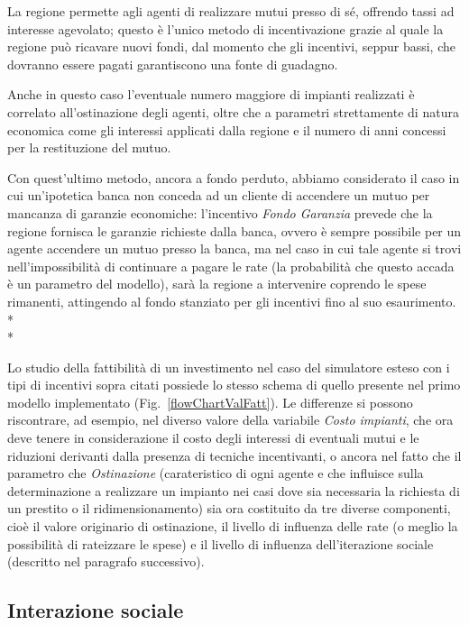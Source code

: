 
La regione permette agli agenti di realizzare mutui presso di sé, offrendo tassi ad interesse agevolato; questo è l'unico metodo di incentivazione grazie al quale la regione può ricavare nuovi fondi, dal momento che gli incentivi, seppur bassi, che dovranno essere pagati garantiscono una fonte di guadagno.

Anche in questo caso l'eventuale numero maggiore di impianti realizzati è correlato all'ostinazione degli agenti, oltre che a parametri strettamente di natura economica come gli interessi applicati dalla regione e il numero di anni concessi per la restituzione del mutuo.


Con quest'ultimo metodo, ancora a fondo perduto, abbiamo considerato il caso in cui un'ipotetica banca non conceda ad un cliente di accendere un mutuo per mancanza di garanzie economiche: l'incentivo \emph{Fondo Garanzia} prevede che la regione fornisca le garanzie richieste dalla banca, ovvero è sempre possibile per un agente accendere un mutuo presso la banca, ma nel caso in cui tale agente si trovi nell'impossibilità di continuare a pagare le rate (la probabilità che questo accada è un parametro del modello), sarà la regione a intervenire coprendo le spese rimanenti, attingendo al fondo stanziato per gli incentivi fino al suo esaurimento.\\*\\*

Lo studio della fattibilità di un investimento nel caso del simulatore esteso con i tipi di incentivi sopra citati possiede lo stesso schema di quello presente nel primo modello implementato (Fig.~\ref{flowChartValFatt}). Le differenze si possono riscontrare, ad esempio, nel diverso valore della variabile \emph{Costo impianti}, che ora deve tenere in considerazione il costo degli interessi di eventuali mutui e le riduzioni derivanti dalla presenza di tecniche incentivanti, o ancora nel fatto che il parametro che \emph{Ostinazione} (carateristico di ogni agente e che influisce sulla determinazione a realizzare un impianto nei casi dove sia necessaria la richiesta di un prestito o il ridimensionamento) sia ora costituito da tre diverse componenti, cioè il valore originario di ostinazione, il livello di influenza delle rate (o meglio la possibilità di rateizzare le spese) e il livello di influenza dell'iterazione sociale (descritto nel paragrafo successivo).

\subsection{Interazione sociale}

